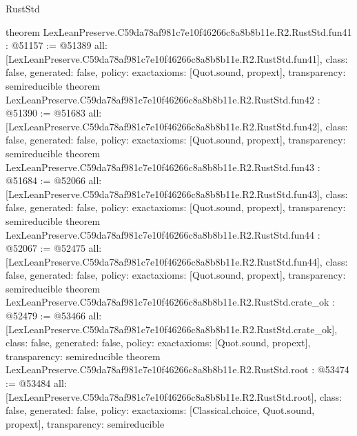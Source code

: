 \begin{lexlean}{RustStd}
\begin{coremodule}
{}
theorem LexLeanPreserve.C59da78af981c7e10f46266c8a8b8b11e.R2.RustStd.fun41 : @51157 := @51389 {
  all: [LexLeanPreserve.C59da78af981c7e10f46266c8a8b8b11e.R2.RustStd.fun41],
  class: false,
  generated: false,
  policy: exact{axioms: [Quot.sound, propext]},
  transparency: semireducible
}
theorem LexLeanPreserve.C59da78af981c7e10f46266c8a8b8b11e.R2.RustStd.fun42 : @51390 := @51683 {
  all: [LexLeanPreserve.C59da78af981c7e10f46266c8a8b8b11e.R2.RustStd.fun42],
  class: false,
  generated: false,
  policy: exact{axioms: [Quot.sound, propext]},
  transparency: semireducible
}
theorem LexLeanPreserve.C59da78af981c7e10f46266c8a8b8b11e.R2.RustStd.fun43 : @51684 := @52066 {
  all: [LexLeanPreserve.C59da78af981c7e10f46266c8a8b8b11e.R2.RustStd.fun43],
  class: false,
  generated: false,
  policy: exact{axioms: [Quot.sound, propext]},
  transparency: semireducible
}
theorem LexLeanPreserve.C59da78af981c7e10f46266c8a8b8b11e.R2.RustStd.fun44 : @52067 := @52475 {
  all: [LexLeanPreserve.C59da78af981c7e10f46266c8a8b8b11e.R2.RustStd.fun44],
  class: false,
  generated: false,
  policy: exact{axioms: [Quot.sound, propext]},
  transparency: semireducible
}
theorem LexLeanPreserve.C59da78af981c7e10f46266c8a8b8b11e.R2.RustStd.crate_ok : @52479 := @53466 {
  all: [LexLeanPreserve.C59da78af981c7e10f46266c8a8b8b11e.R2.RustStd.crate_ok],
  class: false,
  generated: false,
  policy: exact{axioms: [Quot.sound, propext]},
  transparency: semireducible
}
theorem LexLeanPreserve.C59da78af981c7e10f46266c8a8b8b11e.R2.RustStd.root : @53474 := @53484 {
  all: [LexLeanPreserve.C59da78af981c7e10f46266c8a8b8b11e.R2.RustStd.root],
  class: false,
  generated: false,
  policy: exact{axioms: [Classical.choice, Quot.sound, propext]},
  transparency: semireducible
}


\end{coremodule}
\end{lexlean}
